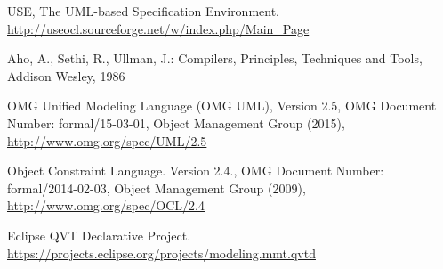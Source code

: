 \documentclass{llncs}
\begin{document}
\begin{thebibliography}{}
USE, The UML-based Specification Environment. \url{http://useocl.sourceforge.net/w/index.php/Main\_Page}

Aho, A., Sethi, R., Ullman, J.: Compilers, Principles, Techniques and Tools, Addison Wesley, 1986

OMG Unified Modeling Language (OMG UML), Version 2.5, {OMG Document Number}: formal/15-03-01, Object Management Group (2015), \url{http://www.omg.org/spec/UML/2.5}

Object Constraint Language. Version 2.4., OMG Document Number: formal/2014-02-03, Object Management Group (2009),  \url{http://www.omg.org/spec/OCL/2.4}

Eclipse QVT Declarative Project.\\
\url{https://projects.eclipse.org/projects/modeling.mmt.qvtd}

\end{thebibliography}
\end{document}
